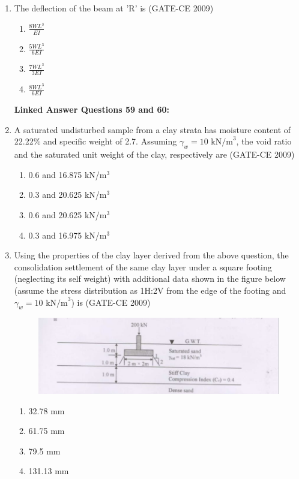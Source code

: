 \documentclass[journal,12pt,onecolumn]{article}
\theoremstyle{remark}
\begin{document}
\begin{enumerate}
    \item The deflection of the beam at 'R' is (GATE-CE 2009)
    \begin{enumerate}
        \item $\frac{8WL^3}{EI}$ 
        \item $\frac{5WL^3}{6EI}$ 
        \item $\frac{7WL^3}{3EI}$ 
        \item $\frac{8WL^3}{6EI}$
    \end{enumerate}
    
\textbf{Linked Answer Questions 59 and 60:}
    \item A saturated undisturbed sample from a clay strata has moisture content of 22.22\% and specific weight of 2.7. Assuming $\gamma_w = 10 \text{ kN/m}^3$, the void ratio and the saturated unit weight of the clay, respectively are (GATE-CE 2009)
    \begin{enumerate}
        \item 0.6 and 16.875 kN/m$^3$ 
        \item 0.3 and 20.625 kN/m$^3$ 
        \item 0.6 and 20.625 kN/m$^3$ 
        \item 0.3 and 16.975 kN/m$^3$
    \end{enumerate}
    
    \item Using the properties of the clay layer derived from the above question, the consolidation settlement of the same clay layer under a square footing (neglecting its self weight) with additional data shown in the figure below (assume the stress distribution as 1H:2V from the edge of the footing and $\gamma_w = 10 \text{ kN/m}^3$) is (GATE-CE 2009)
    \begin{figure}[H]
    \centering
    \includegraphics[width=0.7\columnwidth]{figs/image7.jpg}
    \caption{}
    \label{fig:placeholder}
    \end{figure}
    
    \begin{enumerate}
        \item 32.78 mm 
        \item 61.75 mm 
        \item 79.5 mm 
        \item 131.13 mm
    \end{enumerate}
\end{enumerate}
\end{document}
